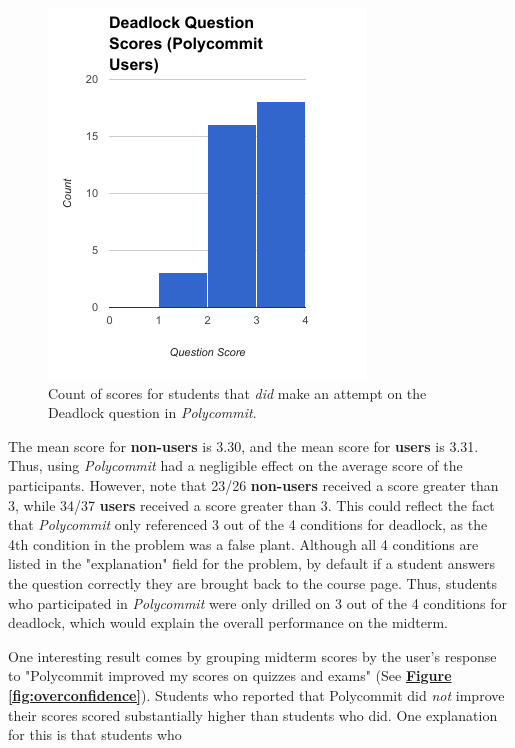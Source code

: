 \begin{figure}[h!b]
	\includegraphics[width=0.5\linewidth]{figures/deadlock-users}
	\caption{Count of scores for students that \textit{did} make an attempt on the Deadlock question in \textit{Polycommit}.}
	\label{fig:deadlock-yes}
\end{figure}

\par The mean score for \textbf{non-users} is 3.30, and the mean score for \textbf{users} is 3.31. Thus, using \textit{Polycommit} had a negligible effect on the average score of the participants. However, note that 23/26 \textbf{non-users} received a score greater than 3, while 34/37 \textbf{users} received a score greater than 3. This could reflect the fact that \textit{Polycommit} only referenced 3 out of the 4 conditions for deadlock, as the 4th condition in the problem was a false plant. Although all 4 conditions are listed in the "explanation" field for the problem, by default if a student answers the question correctly they are brought back to the course page. Thus, students who participated in \textit{Polycommit} were only drilled on 3 out of the 4 conditions for deadlock, which would explain the overall performance on the midterm.

\par One interesting result comes by grouping midterm scores by the user's response to "Polycommit improved my scores on quizzes and exams" (See \textbf{\hyperref[fig:overconfidence]{Figure \ref*{fig:overconfidence}}}). Students who reported that Polycommit did \textit{not} improve their scores scored substantially higher than students who did. One explanation for this is that students who 

